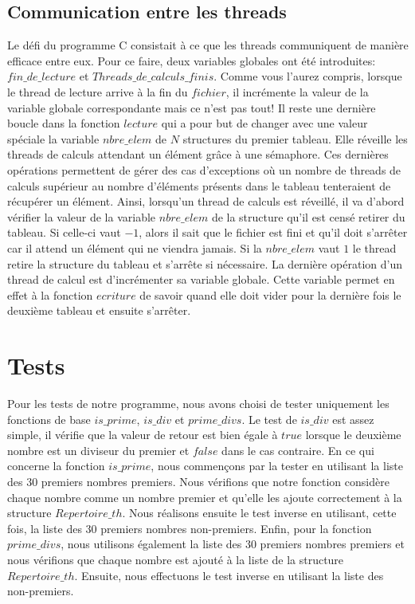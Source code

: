 \documentclass{article}
\begin{document}
\subsection{Communication entre les threads} \label{Com}
Le défi du programme C consistait à ce que les threads communiquent de manière efficace entre eux. Pour ce faire, deux variables globales ont été introduites: $fin\_de\_lecture$ et $Threads\_de\_calculs\_finis$. Comme vous l'aurez compris, lorsque le thread de lecture arrive à la fin du $fichier$, il incrémente la valeur de la variable globale correspondante mais ce n'est pas tout! Il reste une dernière boucle dans la fonction $lecture$ qui a pour but de changer avec une valeur spéciale la variable $nbre\_elem$ de $N$ structures du premier tableau. Elle réveille les threads de calculs attendant un élément grâce à une sémaphore.  Ces dernières opérations permettent de gérer des cas d'exceptions où un nombre de threads de calculs supérieur au nombre d'éléments présents dans le tableau tenteraient de récupérer un élément. Ainsi, lorsqu'un thread de calculs est réveillé, il va d'abord vérifier la valeur de la variable $nbre\_elem$ de la structure qu'il est censé retirer du tableau. Si celle-ci vaut $-1$, alors il sait que le fichier est fini et qu'il doit s'arrêter car il attend un élément qui ne viendra jamais. Si la $nbre\_elem$ vaut $1$ le thread retire la structure du tableau et s'arrête si nécessaire. La dernière opération d'un thread de calcul est d'incrémenter sa variable globale. Cette variable permet en effet à la fonction $ecriture$ de savoir quand elle doit vider pour la dernière fois le deuxième tableau et ensuite s'arrêter.

\section{Tests}
Pour les tests de notre programme, nous avons choisi de tester uniquement les fonctions de base $is\_prime$, $is\_div$ et $prime\_divs$. Le test de $is\_div$ est assez simple, il vérifie que la valeur de retour est bien égale à $true$ lorsque le deuxième nombre est un diviseur du premier et $false$ dans le cas contraire. En ce qui concerne la fonction $is\_prime$, nous commençons par la tester en utilisant la liste des 30 premiers nombres premiers. Nous vérifions que notre fonction considère chaque nombre comme un nombre premier et qu'elle les ajoute correctement à la structure $Repertoire\_th$. Nous réalisons ensuite le test inverse en utilisant, cette fois, la liste des 30 premiers nombres non-premiers. Enfin, pour la fonction $prime\_divs$, nous utilisons également la liste des 30 premiers nombres premiers et nous vérifions que chaque nombre est ajouté à la liste de la structure $Repertoire\_th$. Ensuite, nous effectuons le test inverse en utilisant la liste des non-premiers.
\end{document}
